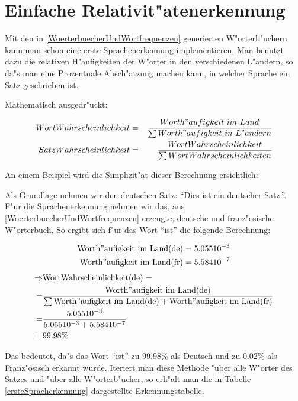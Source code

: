 \section{Einfache Relativit"atenerkennung}

Mit den in \ref{WoerterbuecherUndWortfrequenzen} generierten W"orterb"uchern kann man schon eine erste Sprachenerkennung implementieren. Man benutzt dazu die relativen H"aufigkeiten der W"orter in den verschiedenen L"andern, so da"s man eine Prozentuale Absch"atzung machen kann, in welcher Sprache ein Satz geschrieben ist.

Mathematisch ausgedr"uckt:

\begin{eqnarray}
{WortWahrscheinlichkeit}	&=	&\frac{Worth"aufigkeit\ im\ Land}{\sum Worth"aufigkeit\ in\ L"andern}				\nonumber \\
{SatzWahrscheinlichkeit} 	&=	&\frac{WortWahrscheinlichkeit}{\sum WortWahrscheinlichkeiten}						\nonumber
\end{eqnarray}

An einem Beispiel wird die Simplizit"at dieser Berechnung ersichtlich:

Als Grundlage nehmen wir den deutschen Satz: "`Dies ist ein deutscher Satz."'. F"ur die Sprachenerkennung nehmen wir das, aus \ref{WoerterbuecherUndWortfrequenzen} erzeugte, deutsche und franz"osische W"orterbuch. So ergibt sich f"ur das Wort "`ist"' die folgende Berechnung:

\begin{eqnarray}
{\rm Worth"aufigkeit\ im\ Land(de)}		&= 5.055 10^{-3}	\nonumber \\
{\rm Worth"aufigkeit\ im\ Land(fr)}		&= 5.584 10^{-7}	\nonumber
\end{eqnarray}
\begin{eqnarray}
\Rightarrow &{\rm WortWahrscheinlichkeit(de)} = 	\nonumber \\
	= &\frac{\rm Worth"aufigkeit\ im\ Land(de)}{\sum{ {\rm Worth"aufigkeit\ im\ Land(de)} + {\rm Worth"aufigkeit\ im\ Land(fr)}} }		\nonumber \\
	= &\frac{5.055 10^{-3}}{5.055 10^{-3} + 5.584 10^{-7}}						\nonumber	\\
	= &99.98 \%																	\nonumber
\end{eqnarray}

Das bedeutet, da"s das Wort "`ist"' zu 99.98\% als Deutsch und zu 0.02\%  als Franz"osisch erkannt wurde.
Iteriert man diese Methode "uber alle W"orter des Satzes und "uber alle W"orterb"ucher, so erh"alt man die in Tabelle \ref{ersteSpracherkennung} dargestellte Erkennungstabelle.

